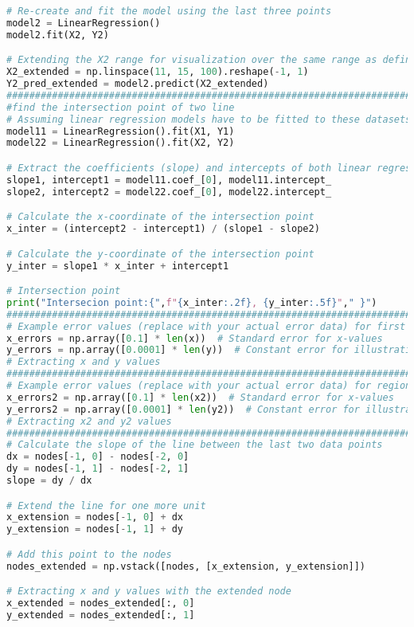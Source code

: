 \documentclass[a4paper,11pt]{article}
\begin{document}
\begin{lstlisting}[language=Python]
# Re-create and fit the model using the last three points
model2 = LinearRegression()
model2.fit(X2, Y2)

# Extending the X2 range for visualization over the same range as defined earlier
X2_extended = np.linspace(11, 15, 100).reshape(-1, 1)
Y2_pred_extended = model2.predict(X2_extended)
#############################################################################
#find the intersection point of two line
# Assuming linear regression models have to be fitted to these datasets
model11 = LinearRegression().fit(X1, Y1)
model22 = LinearRegression().fit(X2, Y2)

# Extract the coefficients (slope) and intercepts of both linear regression models
slope1, intercept1 = model11.coef_[0], model11.intercept_
slope2, intercept2 = model22.coef_[0], model22.intercept_

# Calculate the x-coordinate of the intersection point
x_inter = (intercept2 - intercept1) / (slope1 - slope2)

# Calculate the y-coordinate of the intersection point
y_inter = slope1 * x_inter + intercept1

# Intersection point
print("Intersecion point:{",f"{x_inter:.2f}, {y_inter:.5f}"," }")
############################################################################
# Example error values (replace with your actual error data) for first data
x_errors = np.array([0.1] * len(x))  # Standard error for x-values
y_errors = np.array([0.0001] * len(y))  # Constant error for illustration
# Extracting x and y values
############################################################################
# Example error values (replace with your actual error data) for region of interest
x_errors2 = np.array([0.1] * len(x2))  # Standard error for x-values
y_errors2 = np.array([0.0001] * len(y2))  # Constant error for illustration
# Extracting x2 and y2 values
############################################################################
# Calculate the slope of the line between the last two data points
dx = nodes[-1, 0] - nodes[-2, 0]
dy = nodes[-1, 1] - nodes[-2, 1]
slope = dy / dx

# Extend the line for one more unit
x_extension = nodes[-1, 0] + dx
y_extension = nodes[-1, 1] + dy

# Add this point to the nodes
nodes_extended = np.vstack([nodes, [x_extension, y_extension]])

# Extracting x and y values with the extended node
x_extended = nodes_extended[:, 0]
y_extended = nodes_extended[:, 1]


\end{lstlisting}
\end{document}

